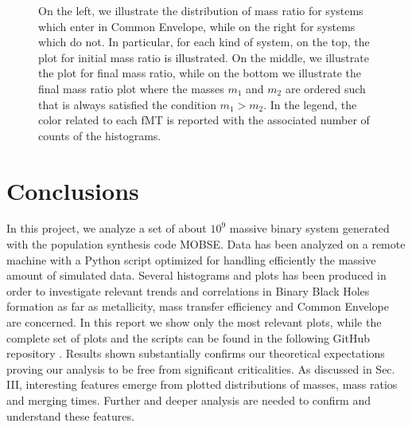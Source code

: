 \documentclass[prb,twocolumn,9pt]{revtex4-1}
\begin{document}
\begin{figure}[htp]
{    On the left, we illustrate the distribution of mass ratio for systems which enter in Common Envelope, while on the right for systems which do not. 
    In particular, for each kind of system, on the top, the plot for initial mass ratio is illustrated. On the middle, we illustrate the plot for final mass ratio, while on the bottom we illustrate the final mass ratio plot where the masses \(m_1\) and \(m_2\) are ordered such that is always satisfied the condition \(m_1>m_2\). In the legend, the color related to each fMT is reported  with the associated number of counts of the histograms.}
    \label{fig:ass2_1_q}
\end{figure}

\vspace{-0.2cm}

\section{Conclusions}
In this project, we analyze a set of about \(10^9\) massive binary system generated  with  the  population  synthesis  code  MOBSE. Data has been analyzed on a remote machine with a Python script optimized for handling efficiently the massive amount of simulated data. Several histograms and plots has been produced in order to investigate relevant trends and correlations in Binary Black Holes formation as far as metallicity, mass transfer efficiency and Common Envelope are concerned.  In this report we show only the most relevant plots, while the complete set of plots and the scripts can be found in the following GitHub repository \cite{git}. 
Results shown substantially confirms our theoretical expectations proving our analysis to be free from significant criticalities. 
As discussed in Sec. III, interesting features emerge from plotted distributions of masses, mass ratios and merging times. 
Further and deeper analysis are needed to confirm and understand these features.
\end{document}
